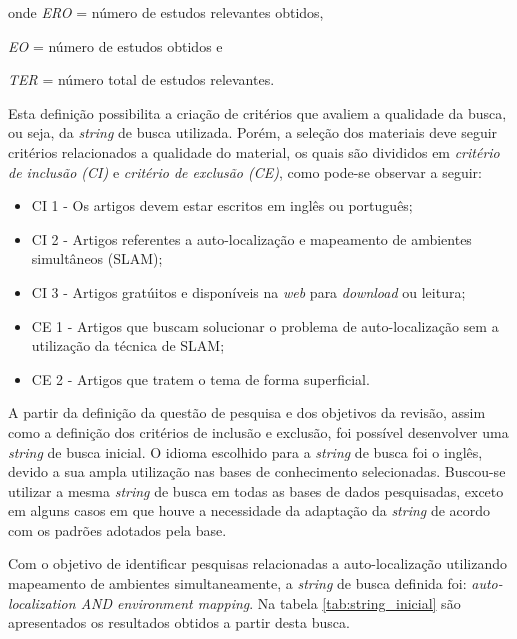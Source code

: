 		onde \textit{ERO} = número de estudos relevantes obtidos,
		
		\textit{EO} = número de estudos obtidos e

		\textit{TER} = número total de estudos relevantes.

		Esta definição possibilita a criação de critérios que avaliem a qualidade da busca, ou seja, da \textit{string} de busca utilizada. Porém, a seleção dos materiais deve seguir critérios relacionados a qualidade do material, os quais são divididos em \textit{critério de inclusão (CI)} e \textit{critério de exclusão (CE)}, como pode-se observar a seguir:

		\begin{itemize}
			\item CI 1 - Os artigos devem estar escritos em inglês ou português;
			\item CI 2 - Artigos referentes a auto-localização e mapeamento de ambientes simultâneos (SLAM);
			\item CI 3 - Artigos gratúitos e disponíveis na \textit{web} para \textit{download} ou leitura;
			\item CE 1 - Artigos que buscam solucionar o problema de auto-localização sem a utilização da técnica de SLAM;
			\item CE 2 - Artigos que tratem o tema de forma superficial. 
		\end{itemize}

		A partir da definição da questão de pesquisa e dos objetivos da revisão, assim como a definição dos critérios de inclusão e exclusão, foi possível desenvolver uma \textit{string} de busca inicial. O idioma escolhido para a \textit{string} de busca foi o inglês, devido a sua ampla utilização nas bases de conhecimento selecionadas. Buscou-se utilizar a mesma \textit{string} de busca em todas as bases de dados pesquisadas, exceto em alguns casos em que houve a necessidade da adaptação da \textit{string} de acordo com os padrões adotados pela base.


			Com o objetivo de identificar pesquisas relacionadas a auto-localização utilizando mapeamento de ambientes simultaneamente, a \textit{string} de busca definida foi: \textit{auto-localization AND environment mapping}. Na tabela \ref{tab:string_inicial} são apresentados os resultados obtidos a partir desta busca.

